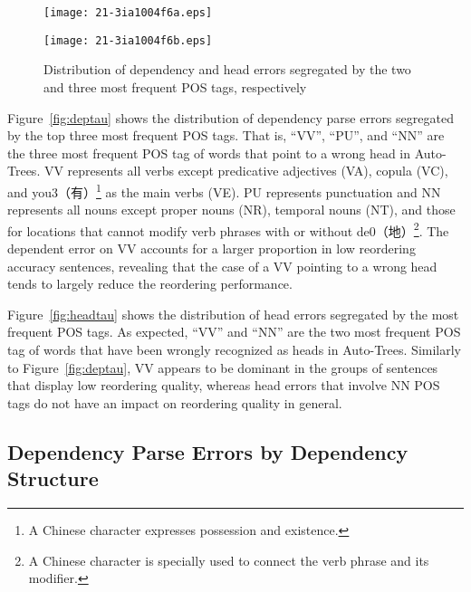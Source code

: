 \documentclass[english]{jnlp_1.4}
\begin{document}
\begin{figure}[b]
\begin{minipage}[t]{196pt}
\texttt{[image: 21-3ia1004f6a.eps]}
\label{fig:deptau}
\end{minipage}
\hfill
\begin{minipage}[t]{196pt}
\texttt{[image: 21-3ia1004f6b.eps]}
\label{fig:headtau}
\end{minipage}
\caption{Distribution of dependency and head errors segregated by the two and three most frequent POS tags, respectively}
\label{fig:poserrortau}
\end{figure}

Figure~\ref{fig:deptau} shows the distribution of dependency parse errors segregated by
the top three most frequent POS tags.
That is, ``VV'', ``PU'', and ``NN'' are the three most frequent POS tag of words that 
point to a wrong head in Auto-Trees. VV represents all verbs except predicative 
adjectives (VA), copula (VC), and you3（有）\footnote{A Chinese character expresses 
possession and existence.} as the main verbs (VE). PU represents punctuation and 
NN represents all nouns except proper nouns (NR), temporal nouns (NT), and those 
for locations that cannot modify verb phrases with or without de0（地）\footnote{A 
Chinese character is specially used to connect the verb phrase and its modifier.}. 
The dependent error on VV accounts for a larger proportion in low reordering accuracy 
sentences, revealing that the case of a VV pointing to a wrong head tends to 
largely reduce the reordering performance.

Figure~\ref{fig:headtau} shows the distribution of head errors segregated by the most frequent POS tags.
As expected, ``VV'' and ``NN'' are the two most frequent POS tag of words that have been 
wrongly recognized as heads in Auto-Trees. Similarly to Figure~\ref{fig:deptau}, 
VV appears to be dominant in the groups of sentences that display low reordering quality,
whereas head errors that involve NN POS tags do not have an impact on reordering quality in general.


\subsection{Dependency Parse Errors by Dependency Structure}
\label{subsec:dp}
\end{document}
